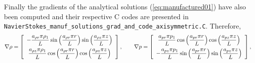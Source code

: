 \documentclass[a4paper,10pt]{article}
\begin{document}
\begin{landscape}
Finally the gradients of the analytical solutions (\ref{eq:manufactured01}) have also been computed and their respective C codes are presented in \\ \texttt{NavierStokes\_manuf\_solutions\_grad\_and\_code\_axisymmetric.C}. Therefore,
\begin{equation*}
\nabla  \rho= \left[ \begin{array}{c}
  -\dfrac{ a_{\rho r} \pi \rho_1 }{L}  \sin\left(\dfrac{a_{\rho r}  \pi  r }{L}\right) \sin\left(\dfrac{a_{\rho z}  \pi  z }{L}\right)\vspace{5pt} \\
   \dfrac{ a_{\rho z}  \pi\rho_1 }{L}\cos\left(\dfrac{a_{\rho r}  \pi  r }{L}\right)  \cos\left(\dfrac{a_{\rho z}  \pi  z }{L}\right)
\end{array} \right],
\qquad
\nabla p = \left[ \begin{array}{c}
   \dfrac{ a_{pr}  \pi p_1}{L}\cos\left(\dfrac{a_{pr}  \pi  r }{L}\right)  \cos\left(\dfrac{a_{pz}  \pi  z }{L}\right)\vspace{5pt} \\
  -\dfrac{ a_{pz}  \pi p_1 }{L} \sin\left(\dfrac{a_{pr}  \pi  r }{L}\right)  \sin\left(\dfrac{a_{pz}  \pi  z }{L}\right)
\end{array} \right], \\
\end{equation*}


\end{landscape}
\end{document}
